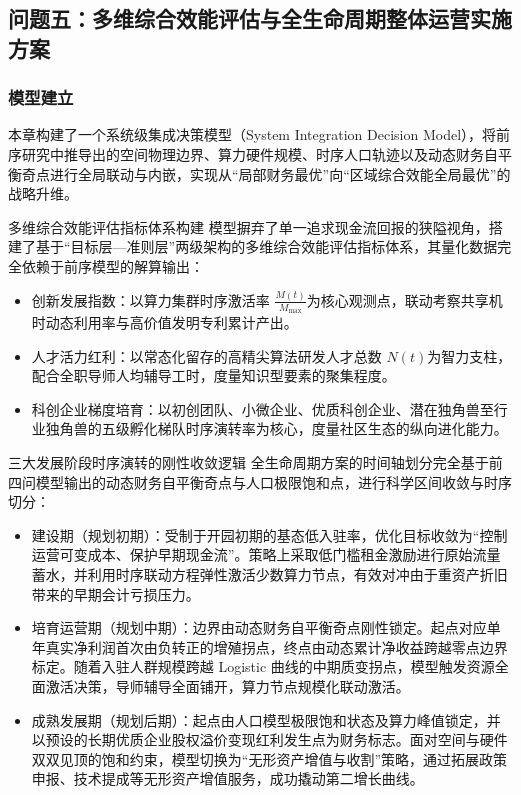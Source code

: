 \documentclass[12pt,a4paper]{article}
\begin{document}
\subsection{问题五：多维综合效能评估与全生命周期整体运营实施方案}
\subsubsection{模型建立}

本章构建了一个系统级集成决策模型（System Integration Decision Model），将前序研究中推导出的空间物理边界、算力硬件规模、时序人口轨迹以及动态财务自平衡奇点进行全局联动与内嵌，实现从“局部财务最优”向“区域综合效能全局最优”的战略升维。

多维综合效能评估指标体系构建
模型摒弃了单一追求现金流回报的狭隘视角，搭建了基于“目标层—准则层”两级架构的多维综合效能评估指标体系，其量化数据完全依赖于前序模型的解算输出：

\begin{itemize}
\item 创新发展指数：以算力集群时序激活率 $\frac{M(t)}{M_{\text{max}}} $为核心观测点，联动考察共享机时动态利用率与高价值发明专利累计产出。
\item 人才活力红利：以常态化留存的高精尖算法研发人才总数 $N(t) $为智力支柱，配合全职导师人均辅导工时，度量知识型要素的聚集程度。
\item 科创企业梯度培育：以初创团队、小微企业、优质科创企业、潜在独角兽至行业独角兽的五级孵化梯队时序演转率为核心，度量社区生态的纵向进化能力。
\end{itemize}
三大发展阶段时序演转的刚性收敛逻辑
全生命周期方案的时间轴划分完全基于前四问模型输出的动态财务自平衡奇点与人口极限饱和点，进行科学区间收敛与时序切分：
\begin{itemize}
\item 建设期（规划初期）：受制于开园初期的基态低入驻率，优化目标收敛为“控制运营可变成本、保护早期现金流”。策略上采取低门槛租金激励进行原始流量蓄水，并利用时序联动方程弹性激活少数算力节点，有效对冲由于重资产折旧带来的早期会计亏损压力。
\item 培育运营期（规划中期）：边界由动态财务自平衡奇点刚性锁定。起点对应单年真实净利润首次由负转正的增殖拐点，终点由动态累计净收益跨越零点边界标定。随着入驻人群规模跨越 Logistic 曲线的中期质变拐点，模型触发资源全面激活决策，导师辅导全面铺开，算力节点规模化联动激活。
\item 成熟发展期（规划后期）：起点由人口模型极限饱和状态及算力峰值锁定，并以预设的长期优质企业股权溢价变现红利发生点为财务标志。面对空间与硬件双双见顶的饱和约束，模型切换为“无形资产增值与收割”策略，通过拓展政策申报、技术提成等无形资产增值服务，成功撬动第二增长曲线。
\end{itemize}
\end{document}
